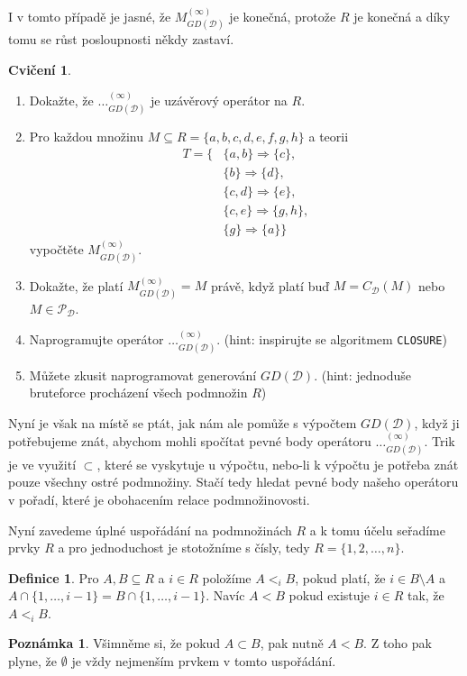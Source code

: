 \documentclass{article}
\theoremstyle {definition}
\newtheorem{definition}{Definice}
\newtheorem*{remark}{Poznámka}
\newtheorem{exercise}{Cvičení}
\begin{document}
I v tomto případě je jasné, že $M^{(\infty)}_{GD(\mathcal{D})}$ je
konečná, protože $R$ je konečná a díky tomu se růst posloupnosti někdy
zastaví.

\begin {exercise}
  \begin {enumerate}
  \item Dokažte, že $\dots^{(\infty)}_{GD(\mathcal{D})}$ je uzávěrový
    operátor na $R$.
  \item Pro každou množinu $M\subseteq R= \{a,b,c,d,e,f,g,h\}$ a
    teorii
    \begin {align*}
      T= \{
      &\{a,b\}\Rightarrow \{c\},\\
      &\{b\}\Rightarrow \{d\},\\
      &\{c,d\}\Rightarrow \{e\},\\
      &\{c,e\}\Rightarrow \{g,h\},\\
      &\{g\}\Rightarrow \{a\}\}
    \end {align*}
    vypočtěte $M^{(\infty)}_{GD(\mathcal{D})}$.
  \item Dokažte, že platí $M^{(\infty)}_{GD(\mathcal{D})} = M$ právě, když
    platí buď $M = C_{\mathcal{D}}(M)$ nebo $M\in \mathcal P_{\mathcal D}$.
  \item Naprogramujte operátor $\dots^{(\infty)}_{GD(\mathcal{D})}$.
    (hint: inspirujte se algoritmem \texttt {CLOSURE})
  \item Můžete zkusit naprogramovat generování $GD(\mathcal{D})$.
    (hint: jednoduše bruteforce procházení všech podmnožin $R$) 
  \end {enumerate}
\end {exercise}

Nyní je však na místě se ptát, jak nám ale pomůže s výpočtem
$GD(\mathcal{D})$, když ji potřebujeme znát, abychom mohli spočítat
pevné body operátoru $\dots^{(\infty)}_{GD(\mathcal{D})}$. Trik je ve
využití $\subset$, které se vyskytuje u výpočtu, nebo-li k výpočtu je
potřeba znát pouze všechny ostré podmnožiny. Stačí tedy hledat pevné
body našeho operátoru v pořadí, které je obohacením relace
podmnožinovosti.

Nyní zavedeme úplné uspořádání na podmnožinách $R$ a k tomu účelu
seřadíme prvky $R$ a pro jednoduchost je stotožníme s čísly, tedy
$R=\{1,2,\dots,n\}$.

\begin {definition}
  Pro $A,B\subseteq R$ a $i\in R$ položíme $A<_iB$, pokud
  platí, že $i\in B\setminus A$ a $A\cap \{1,\dots,i-1\} = B\cap
  \{1,\dots,i-1\}$. Navíc $A<B$ pokud existuje $i\in R$ tak, že
  $A<_iB$.
\end {definition}
\begin {remark}
  Všimněme si, že pokud $A\subset B$, pak nutně $A<B$. Z toho pak
  plyne, že $\emptyset$ je vždy nejmenším prvkem v tomto uspořádání.
\end {remark}
\end{document}
